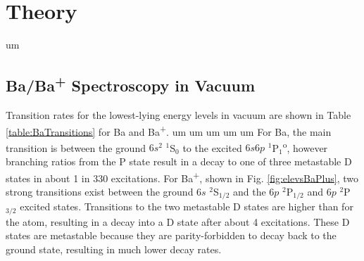 \chapter{Theory}


um

\section{Ba/Ba\textsuperscript{+} Spectroscopy in Vacuum}


Transition rates for the lowest-lying energy levels in vacuum are shown in Table \ref{table:BaTransitions} for Ba and Ba\textsuperscript{+}.  um um um um um For Ba, the main transition is between the ground $6s^{2}$ $^{1}$S$_{0}$ to the excited $6s6p$ $^{1}$P$_{1}$\textsuperscript{o}, however branching ratios from the P state result in a decay to one of three metastable D states in about 1 in 330 excitations.  For Ba\textsuperscript{+}, shown in Fig. \ref{fig:elevsBaPlus}, two strong transitions exist between the ground $6s$ $^{2}$S$_{1/2}$ and the $6p$ $^{2}$P$_{1/2}$ and $6p$ $^{2}$P$_{3/2}$ excited states.  Transitions to the two metastable D states are higher than for the atom, resulting in a decay into a D state after about 4 excitations.  These D states are metastable because they are parity-forbidden to decay back to the ground state, resulting in much lower decay rates.


